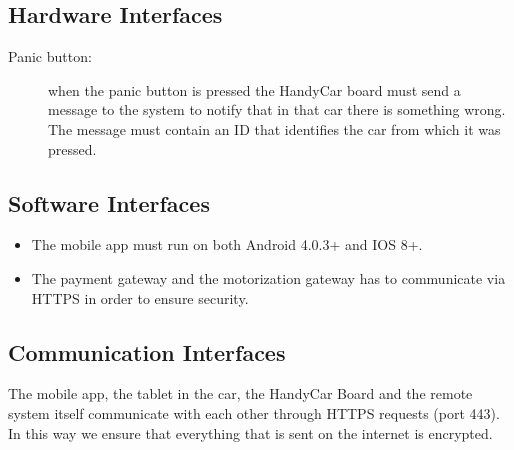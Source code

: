 \subsection{Hardware Interfaces}
\begin{description}
	\item [Panic button:] when the panic button is pressed the HandyCar board must send a message to the system to notify that in that car there is something wrong. The message must contain an ID that identifies the car from which it was pressed.
\end{description}

\subsection{Software Interfaces}
\begin{itemize}
\item The mobile app must run on both Android 4.0.3+ and IOS 8+.
\item The payment gateway and the motorization gateway has to communicate via HTTPS in order to ensure security.
\end{itemize}

\subsection{Communication Interfaces}
The mobile app, the tablet in the car, the HandyCar Board and the remote system itself communicate with each other through HTTPS requests (port 443). In this way we ensure that everything that is sent on the internet is encrypted.
